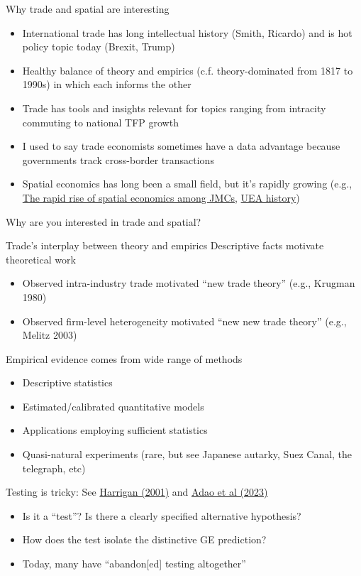 \documentclass[10pt,notes=hide]{beamer}
\begin{document}
\begin{frame}{Why trade and spatial are interesting}
\begin{itemize}
	\item International trade has long intellectual history (Smith, Ricardo) and is hot policy topic today (Brexit, Trump)
	\item Healthy balance of theory and empirics (c.f. theory-dominated from 1817 to 1990s) in which each informs the other
	\item Trade has tools and insights relevant for topics ranging from intracity commuting to national TFP growth
	\item I used to say trade economists sometimes have a data advantage because governments track cross-border transactions
	\item Spatial economics has long been a small field, but it's rapidly growing (e.g., \href{https://tradediversion.net/2019/11/11/the-rapid-rise-of-spatial-economics-among-jmcs/}{The rapid rise of spatial economics among JMCs}, \href{https://urbaneconomics.org/about/history.html}{UEA history})
\end{itemize}
\vspace{0.5cm}
Why are you interested in trade and spatial?
\end{frame}
\begin{frame}{Trade's interplay between theory and empirics}
Descriptive facts motivate theoretical work
\begin{itemize}
	\item Observed intra-industry trade motivated ``new trade theory'' (e.g., Krugman 1980)
	\item Observed firm-level heterogeneity motivated ``new new trade theory'' (e.g., Melitz 2003)
\end{itemize}
Empirical evidence comes from wide range of methods
\begin{itemize}
	\item Descriptive statistics
	\item Estimated/calibrated quantitative models
	\item Applications employing sufficient statistics
	\item Quasi-natural experiments (rare, but see Japanese autarky, Suez Canal, the telegraph, etc)
\end{itemize}
Testing is tricky: See \href{https://www.nber.org/papers/w8675}{Harrigan (2001)} and \href{https://www.nber.org/papers/w31321}{Adao et al (2023)}
\begin{itemize}
\item Is it a ``test''? Is there a clearly specified alternative hypothesis?
\item How does the test isolate the distinctive GE prediction?
\item Today, many have ``abandon[ed] testing altogether''
\end{itemize}
\end{frame}
\end{document}

